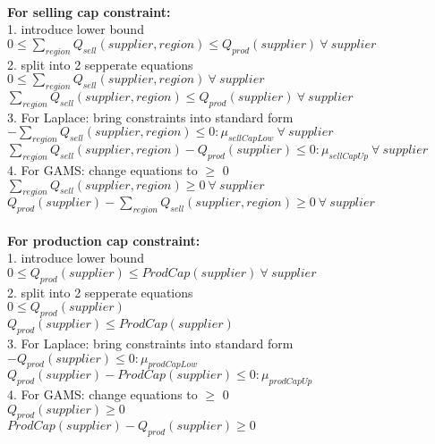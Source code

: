 \documentclass{article}
\begin{document}
\hfill\\
\textbf{For	selling cap constraint: }\\
1. introduce lower bound\\
\quad	$0 \leq \sum_{region} Q_{sell}(supplier, region)  \leq Q_{prod}(supplier) \: \forall \: supplier$\\
2. split into 2 sepperate equations\\
\quad$0 \leq \sum_{region} Q_{sell}(supplier, region) \: \forall \: supplier $\\
\quad$\sum_{region} Q_{sell}(supplier, region) \leq Q_{prod}(supplier) \: \forall \: supplier$\\
3. For Laplace: bring constraints into standard form\\
\quad$ - \sum_{region} Q_{sell}(supplier, region) \leq 0 : \mu_{sellCapLow}\: \forall \: supplier $\\
\quad$\sum_{region} Q_{sell}(supplier, region) - Q_{prod}(supplier)  \leq 0 : \mu_{sellCapUp}\: \forall \: supplier$\\
4. For GAMS: change equations to $\geq$ 0\\
\quad$ \sum_{region} Q_{sell}(supplier, region) \geq 0 \: \forall \: supplier $\\
\quad$Q_{prod}(supplier)  - \sum_{region} Q_{sell}(supplier, region) \geq 0\: \forall \: supplier$\\


\hfill\\
\textbf{For	production cap constraint: }\\
1. introduce lower bound\\
\quad$0 \leq Q_{prod}(supplier) \leq ProdCap(supplier) \: \forall \: supplier$\\  
2. split into 2 sepperate equations\\
\quad$0 \leq Q_{prod}(supplier) $\\  
\quad$Q_{prod}(supplier) \leq ProdCap(supplier)$\\
3. For Laplace: bring constraints into standard form\\
\quad$- Q_{prod}(supplier) \leq 0 : \mu_{prodCapLow} $\\  
\quad$Q_{prod}(supplier) - ProdCap(supplier)\leq 0  : \mu_{prodCapUp}$\\
4. For GAMS: change equations to $\geq$ 0\\
\quad$Q_{prod}(supplier) \geq 0 $\\  
\quad$ProdCap(supplier) - Q_{prod}(supplier) \geq 0$\\
\end{document}
